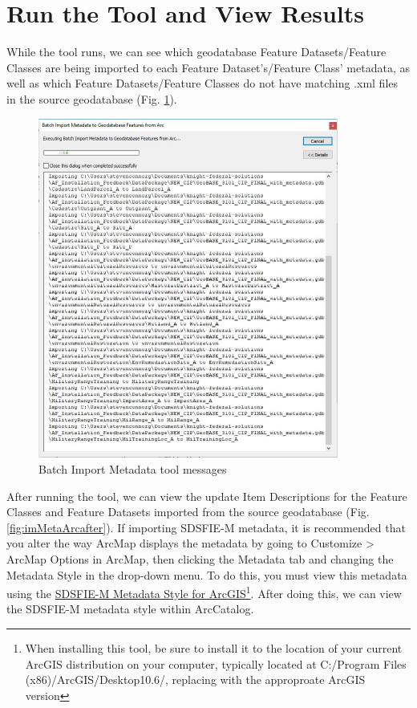 \documentclass[openany]{book}
\let\rmarkdownfootnote\footnote%
\def\footnote{\protect\rmarkdownfootnote}
\theoremstyle{definition}
\theoremstyle{definition}
\theoremstyle{definition}
\theoremstyle{remark}
\begin{document}
\section{Run the Tool and View
Results}\label{run-the-tool-and-view-results-12}

While the tool runs, we can see which geodatabase Feature
Datasets/Feature Classes are being imported to each Feature
Dataset's/Feature Class' metadata, as well as which Feature
Datasets/Feature Classes do not have matching .xml files in the source
geodatabase (Fig. \ref{fig:imMetaArcmessages}).

\begin{figure}[H]

{\centering \includegraphics[width=3.89in,]{figures/imMetaArc-messages} 

}

\caption{Batch Import Metadata tool messages}\label{fig:imMetaArcmessages}
\end{figure}

After running the tool, we can view the update Item Descriptions for the
Feature Classes and Feature Datasets imported from the source
geodatabase (Fig. \ref{fig:imMetaArcafter}). If importing SDSFIE-M
metadata, it is recommended that you alter the way ArcMap displays the
metadata by going to Customize \textgreater{} ArcMap Options in ArcMap,
then clicking the Metadata tab and changing the Metadata Style in the
drop-down menu. To do this, you must view this metadata using the
\href{https://www.sdsfieonline.org/Standards/Metadata}{SDSFIE-M Metadata
Style for ArcGIS}\footnote{When installing this tool, be sure to install
  it to the location of your current ArcGIS distribution on your
  computer, typically located at C:/Program Files
  (x86)/ArcGIS/Desktop10.6/, replacing with the approproate ArcGIS
  version}. After doing this, we can view the SDSFIE-M metadata style
within ArcCatalog.
\end{document}
